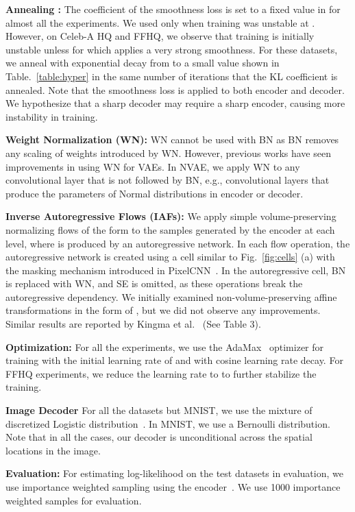 \documentclass{article}
\begin{document}
\textbf{Annealing :} The coefficient of the smoothness loss  is set to a fixed value in  for almost all the experiments. We used  only when training was unstable at . However, on Celeb-A HQ and FFHQ, we observe that training is initially unstable unless for    which applies a very strong smoothness. For these datasets, we anneal  with exponential decay from  to a small value shown in Table.~\ref{table:hyper} in the same number of iterations that the KL coefficient is annealed. Note that the smoothness loss is applied to both encoder and decoder. We hypothesize that a sharp decoder may require a sharp encoder, causing more instability in training.

\textbf{Weight Normalization (WN):} WN cannot be used with BN as BN removes any scaling of weights introduced by WN. However, previous works have seen improvements in using WN for VAEs. In NVAE, we apply WN to any convolutional layer that is not followed by BN, e.g., convolutional layers that produce the parameters of Normal distributions in encoder or decoder. 

\textbf{Inverse Autoregressive Flows (IAFs):} We apply simple volume-preserving normalizing flows of the form  to the samples generated by the encoder at each level, where  is produced by an autoregressive network.  In each flow operation, the autoregressive network is created using a cell similar to Fig.~\ref{fig:cells} (a) with the masking mechanism introduced in PixelCNN~\cite{van2016pixel}. In the autoregressive cell, BN is replaced with WN, and SE is omitted, as these operations break the autoregressive dependency. We initially examined non-volume-preserving affine transformations in the form of , but we did not observe any improvements. Similar results are reported by Kingma et al.~\cite{kingma2016improved} (See Table 3).

\textbf{Optimization:} For all the experiments, we use the AdaMax~\cite{kingma2014adam} optimizer for training with the initial learning rate of  and with cosine learning rate decay. For FFHQ experiments, we reduce the learning rate to  to further stabilize the training.

\textbf{Image Decoder } For all the datasets but MNIST, we use the mixture of discretized Logistic distribution~\cite{salimans2017pixelcnn++}. In MNIST, we use a Bernoulli distribution. Note that in all the cases, our decoder is unconditional across the spatial locations in the image. 

\textbf{Evaluation:} For estimating log-likelihood on the test datasets in evaluation, we use importance weighted sampling using the encoder~\cite{burda2015importance}. We use 1000 importance weighted samples for evaluation.
\end{document}
